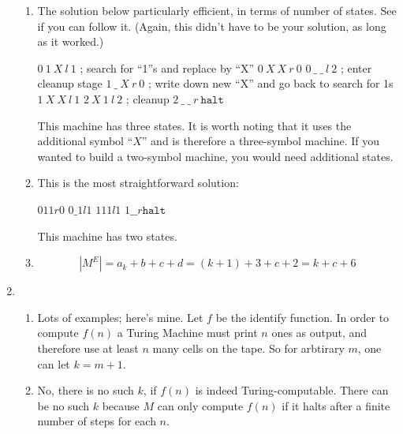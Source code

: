 \documentclass[12pt,a4paper]{article}
\begin{document}
\begin{enumerate}
\begin{enumerate}
\item The solution below particularly efficient, in terms of number of states. See if you can follow it. (Again, this didn't have to be your solution, as long as it worked.)\newline

$0 \ 1 \ X \ l \ 1$ ; search for ``1''s and replace by ``X'' \newline
$0 \ X \ X \ r \ 0$ \newline
$0 \ \_ \ \_ \ l \ 2$ ; enter cleanup stage \newline
$1 \ \_ \ X \ r \ 0$ ; write down new ``X'' and go back to search for 1s \newline
$1 \ X \ X \ l \ 1$ \newline
$2 \ X \ 1 \ l \ 2$ ; cleanup \newline
$2 \ \_ \ \_ \ r \ \texttt{halt}$\newline

This machine has three states. It is worth noting that it uses the additional symbol ``$X$'' and is therefore a three-symbol machine. If you wanted to build a two-symbol machine, you would need additional states.

\item This is the most straightforward solution:\newline

$0 1 1 r 0$ \newline
$0 \_ 1 l 1$ \newline
$1 1 1 l 1$ \newline
$1 \_ \_ r \texttt{halt}$\newline

This machine has two states.

\item

$$|M^E| = a_k + b + c + d = (k+1) + 3 + c + 2 = k+ c + 6$$

\end{enumerate}

\item 
\begin{enumerate}
\item Lots of examples; here's mine. Let $f$ be the identify function. In order to compute $f(n)$ a Turing Machine must print $n$ ones as output, and therefore use at least $n$ many cells on the tape. So for arbtirary $m$, one can let $k = m+1$.

\item No, there is no such $k$, if $f(n)$ is indeed Turing-computable. There can be no such $k$ because $M$ can only compute $f(n)$ if it halts after a finite number of steps for each $n$.


\end{enumerate}
\end{enumerate}
\end{document}
